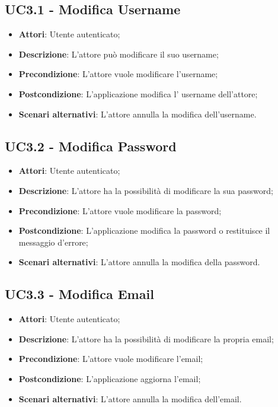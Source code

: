 \subsection{UC3.1 - Modifica Username} 
\label{ssec:UC3.1} 
\begin{itemize} 
\item \textbf{Attori}: Utente autenticato;
\item \textbf{Descrizione}: L'attore può modificare il suo username;
\item \textbf{Precondizione}: L'attore vuole modificare l'username;
\item \textbf{Postcondizione}: L'applicazione modifica l' username dell'attore;
\item \textbf{Scenari alternativi}: L'attore annulla la modifica dell'username.
\end{itemize} 
\subsection{UC3.2 - Modifica Password} 
\label{ssec:UC3.2} 
\begin{itemize} 
\item \textbf{Attori}: Utente autenticato;
\item \textbf{Descrizione}: L'attore ha la possibilità di modificare la sua password;
\item \textbf{Precondizione}: L'attore vuole modificare la password;
\item \textbf{Postcondizione}: L'applicazione modifica la password o restituisce il messaggio d'errore;
\item \textbf{Scenari alternativi}: L'attore annulla la modifica della password.
\end{itemize} 
\subsection{UC3.3 - Modifica Email} 
\label{ssec:UC3.3} 
\begin{itemize} 
\item \textbf{Attori}: Utente autenticato;
\item \textbf{Descrizione}: L'attore ha la possibilità di modificare la propria email;
\item \textbf{Precondizione}: L'attore vuole modificare l'email;
\item \textbf{Postcondizione}: L'applicazione aggiorna l'email;
\item \textbf{Scenari alternativi}: L'attore annulla la modifica dell'email.
\end{itemize} 
